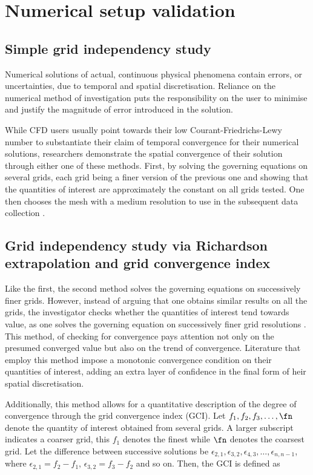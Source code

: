 \documentclass[a4paper,fleqn]{cas-sc}
\begin{document}
\section{Numerical setup validation} \label{sec:numSetup}
\subsection{Simple grid independency study} \label{ssec:simpGCI}
Numerical solutions of actual, continuous physical phenomena contain errors, or uncertainties, due to temporal and spatial discretisation. Reliance on the numerical method of investigation puts the responsibility on the user to minimise and justify the magnitude of error introduced in the solution.

While CFD users usually point towards their low Courant-Friedrichs-Lewy number to substantiate their claim of temporal convergence for their numerical solutions, researchers demonstrate the spatial convergence of their solution through either one of these methods. First, by solving the governing equations on several grids, each grid being a finer version of the previous one and showing that the quantities of interest are approximately the constant on all grids tested. One then chooses the mesh with a medium resolution to use in the subsequent data collection \citep{Wu2011,Ding2013,Ding2015a,Ding2019}.

\subsection{Grid independency study via Richardson extrapolation and grid convergence index} \label{ssec:richExtrap}
Like the first, the second method solves the governing equations on successively finer grids. However, instead of arguing that one obtains similar results on all the grids, the investigator checks whether the quantities of interest tend towards value, as one solves the governing equation on successively finer grid resolutions \citep{Richardson1927,Stern2001}. This method, of checking for convergence pays attention not only on the presumed converged value but also on the trend of convergence. Literature that employ this method impose a monotonic convergence condition \citep{Stern2001,MatAli2011,Ali2012,Maruai2018} on their quantities of interest, adding an extra layer of confidence in the final form of heir spatial discretisation.

Additionally, this method allows for a quantitative description of the degree of convergence through the grid convergence index (GCI). Let $f_{1},f_{2},f_{3},\dots,\fn$ denote the quantity of interest obtained from several grids. A larger subscript indicates a coarser grid, this $f_{1}$ denotes the finest while $\fn$ denotes the coarsest grid. Let the difference between successive solutions be $\epsilon_{2,1},\epsilon_{3,2},\epsilon_{4,3},\dots,\epsilon_{n,n-1}$, where $\epsilon_{2,1} = f_{2} - f_{1}$, $\epsilon_{3,2} = f_{3} - f_{2}$ and so on. Then, the GCI is defined as
\end{document}

